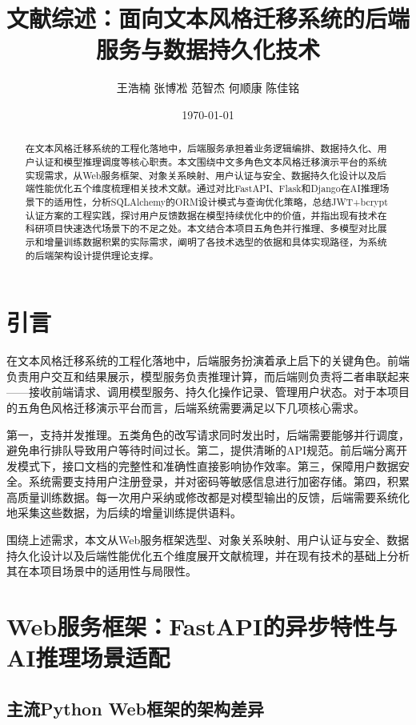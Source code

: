 \documentclass[12pt,a4paper]{ctexart}
\title{\heiti 文献综述：面向文本风格迁移系统的后端服务与数据持久化技术}
\author{\kaishu 王浩楠 \quad 张博凇 \quad 范智杰 \quad 何顺康 \quad 陈佳铭}
\date{\today}
\begin{document}
\maketitle

\begin{abstract}
在文本风格迁移系统的工程化落地中，后端服务承担着业务逻辑编排、数据持久化、用户认证和模型推理调度等核心职责。本文围绕中文多角色文本风格迁移演示平台的系统实现需求，从Web服务框架、对象关系映射、用户认证与安全、数据持久化设计以及后端性能优化五个维度梳理相关技术文献。通过对比FastAPI、Flask和Django在AI推理场景下的适用性，分析SQLAlchemy的ORM设计模式与查询优化策略，总结JWT+bcrypt认证方案的工程实践，探讨用户反馈数据在模型持续优化中的价值，并指出现有技术在科研项目快速迭代场景下的不足之处。本文结合本项目五角色并行推理、多模型对比展示和增量训练数据积累的实际需求，阐明了各技术选型的依据和具体实现路径，为系统的后端架构设计提供理论支撑。
\end{abstract}

\newpage
\tableofcontents
\newpage

\section{引言}

在文本风格迁移系统的工程化落地中，后端服务扮演着承上启下的关键角色。前端负责用户交互和结果展示，模型服务负责推理计算，而后端则负责将二者串联起来——接收前端请求、调用模型服务、持久化操作记录、管理用户状态。对于本项目的五角色风格迁移演示平台而言，后端系统需要满足以下几项核心需求。

第一，支持并发推理。五类角色的改写请求同时发出时，后端需要能够并行调度，避免串行排队导致用户等待时间过长。第二，提供清晰的API规范。前后端分离开发模式下，接口文档的完整性和准确性直接影响协作效率。第三，保障用户数据安全。系统需要支持用户注册登录，并对密码等敏感信息进行加密存储。第四，积累高质量训练数据。每一次用户采纳或修改都是对模型输出的反馈，后端需要系统化地采集这些数据，为后续的增量训练提供语料。

围绕上述需求，本文从Web服务框架选型、对象关系映射、用户认证与安全、数据持久化设计以及后端性能优化五个维度展开文献梳理，并在现有技术的基础上分析其在本项目场景中的适用性与局限性。

\section{Web服务框架：FastAPI的异步特性与AI推理场景适配}

\subsection{主流Python Web框架的架构差异}
\end{document}
